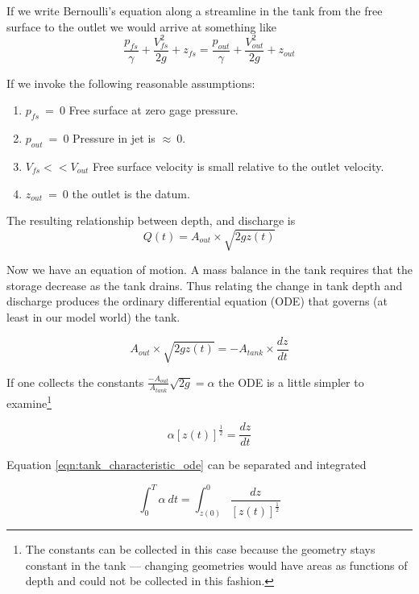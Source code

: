 If we write Bernoulli's equation along a streamline in the tank from the free surface to the outlet we would arrive at something like
\begin{equation}
\frac{p_{fs}}{\gamma}+\frac{V_{fs}^2}{2g}+z_{fs} = \frac{p_{out}}{\gamma}+\frac{V_{out}^2}{2g}+z_{out}
\label{eqn:tank_bernoulli}
\end{equation}

If we invoke the following reasonable assumptions:
\begin{enumerate}
\item $p_{fs}~=~0$ Free surface at zero gage pressure.
\item $p_{out}~=~0$ Pressure in jet is $\approx~0$.
\item $V_{fs} << V_{out}$ Free surface velocity is small relative to the outlet velocity.
\item $z_{out}~=~0$ the outlet is the datum.
\end{enumerate}

The resulting relationship between depth, and discharge is
\begin{equation}
Q(t)=A_{out} \times \sqrt{2gz(t)}
\label{eqn:tank_discharge}
\end{equation}

Now we have an equation of motion.  A mass balance in the tank requires that the storage decrease as the tank drains. Thus relating the change in tank depth and discharge produces the ordinary differential equation (ODE) that governs (at least in our model world) the tank.

\begin{equation}
A_{out} \times \sqrt{2gz(t)}=-A_{tank} \times \frac{d z}{d t}
\label{eqn:tank_ode}
\end{equation}

If one collects the constants $\frac{-A_{out}}{A_{tank}}\sqrt{2g} = \alpha$ the ODE is a little simpler to examine\footnote{The constants can be collected in this case because the geometry stays constant in the tank --- changing geometries would have areas as functions of depth and could not be collected in this fashion.}

\begin{equation}
\alpha  [z(t)]^{\frac{1}{2}}=  \frac{d z}{d t}
\label{eqn:tank_characteristic_ode}
\end{equation}

Equation \ref{eqn:tank_characteristic_ode} can be separated and integrated

\begin{equation}
\int_0^T{\alpha~dt }= \int_{z(0)}^0{ \frac{d z}{ [z(t)]^{\frac{1}{2}}} }
\label{eqn:tank_characteristic_integrated}
\end{equation}

